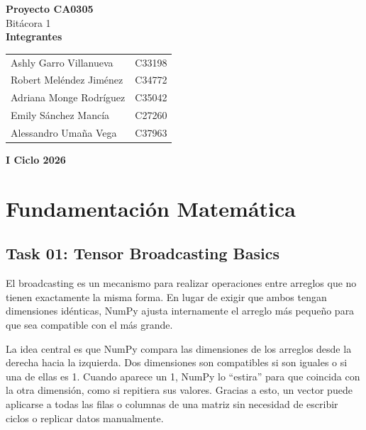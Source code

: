\documentclass[12pt]{article}
\begin{document}
\begin{titlepage}
\centering

\vspace*{\fill}
{\Large \textbf{Proyecto CA0305}} \\
{\large Bitácora 1} \\
\vspace{2cm}
{\large \textbf{Integrantes}} \\
\vspace{1cm}
\begin{tabular}{p{6cm} p{2cm}}
Ashly Garro Villanueva & C33198 \\
Robert Meléndez Jiménez & C34772 \\
Adriana Monge Rodríguez & C35042 \\
Emily Sánchez Mancía & C27260 \\
Alessandro Umaña Vega & C37963 \\
\end{tabular}

\vspace{2cm}

{\large \textbf{I Ciclo 2026}}
\vspace*{\fill}

\end{titlepage}

\newpage

\section*{Fundamentación Matemática}

\subsection*{Task 01: Tensor Broadcasting Basics}
El broadcasting es un mecanismo para realizar operaciones entre arreglos que no tienen exactamente la misma forma. En lugar de exigir que ambos tengan dimensiones idénticas, NumPy ajusta internamente el arreglo más pequeño para que sea compatible con el más grande. 

La idea central es que NumPy compara las dimensiones de los arreglos desde la derecha hacia la izquierda. Dos dimensiones son compatibles si son iguales o si una de ellas es 1. Cuando aparece un 1, NumPy lo “estira” para que coincida con la otra dimensión, como si repitiera sus valores. Gracias a esto, un vector puede aplicarse a todas las filas o columnas de una matriz sin necesidad de escribir ciclos o replicar datos manualmente.
\end{document}
